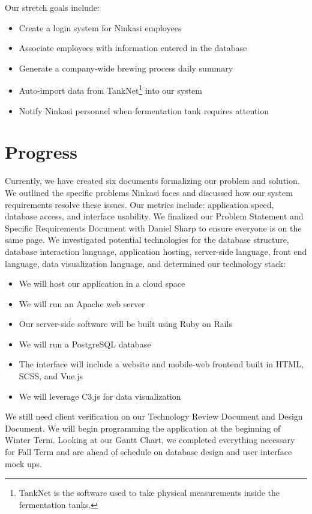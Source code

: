 \documentclass[draftclsnofoot,onecolumn,letterpaper,10pt,compsoc]{IEEEtran}
\begin{document}
Our stretch goals include:
\begin{itemize}
  \item Create a login system for Ninkasi employees
	\item Associate employees with information entered in the database
  \item Generate a company-wide brewing process daily summary
  \item Auto-import data from TankNet\footnote{TankNet is the software used to take physical measurements inside the fermentation tanks.} into our system
  \item Notify Ninkasi personnel when fermentation tank requires attention
\end{itemize}
\section{Progress}

Currently, we have created six documents formalizing our problem and solution.
We outlined the specific problems Ninkasi faces and discussed how our system requirements resolve these issues.
Our metrics include: application speed, database access, and interface usability.
We finalized our Problem Statement and Specific Requirements Document with Daniel Sharp to ensure everyone is on the same page.
We investigated potential technologies for the database structure, database interaction language, application hosting, server-side language, front end language, data visualization language, and determined our technology stack:
\begin{itemize}
	\item We will host our application in a cloud space
	\item We will run an Apache web server
	\item Our server-side software will be built using Ruby on Rails
	\item We will run a PostgreSQL database
	\item The interface will include a website and mobile-web frontend built in HTML, SCSS, and Vue.js
	\item We will leverage C3.js for data visualization
\end{itemize}

\noindent
We still need client verification on our Technology Review Document and Design Document.
We will begin programming the application at the beginning of Winter Term.
Looking at our Gantt Chart, we completed everything necessary for Fall Term and are ahead of schedule on database design and user interface mock ups.
\end{document}
